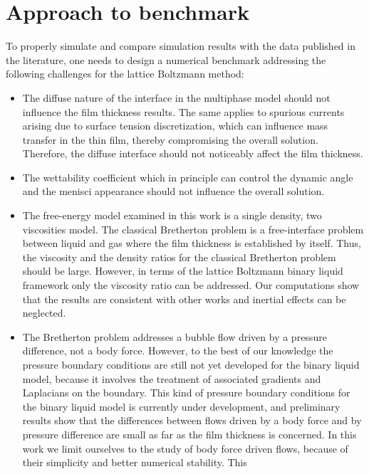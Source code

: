 \documentclass[preprint,12pt]{elsarticle}
\begin{document}
\section{Approach to benchmark}
To properly simulate and compare simulation results with the data
published in the literature, one needs to design a numerical benchmark addressing
the following challenges for the lattice Boltzmann method:
\begin{itemize}
 \item The diffuse nature of the interface in the multiphase model should not
influence the film thickness results.  The same applies to spurious
currents arising due to surface tension discretization, which
can influence mass transfer in the thin film, thereby compromising the
overall solution. Therefore, the diffuse interface should not noticeably affect the film
thickness.
 \item The wettability coefficient which in principle can control the
dynamic angle and the menisci appearance \cite{pagonabarraga-finger} should not
influence the overall solution.
 \item The free-energy model examined in this work is a single density, two
viscosities model. The classical Bretherton problem is a free-interface problem between liquid and
gas
where the film thickness is established by itself. Thus, the viscosity and the density ratios for
the
classical
Bretherton problem should
be large. However, in terms of the lattice Boltzmann binary liquid framework only the viscosity
ratio can be addressed. Our computations show that the results are consistent with other works and
inertial effects can be neglected.
  \item The Bretherton problem addresses a bubble flow driven by a pressure
difference, not a body force. However, to the best of our knowledge the pressure boundary
conditions are still not yet developed for the binary liquid model, because it involves the
treatment of associated gradients and Laplacians on the boundary.
This kind of pressure boundary conditions for the binary liquid model is currently
under development, and preliminary results show that the differences between flows driven by a body
force and by
pressure difference are small as far as the film
 thickness is concerned.  In this work we limit ourselves to the study
of body force driven flows, because of their simplicity and better numerical stability. This

\end{itemize}
\end{document}
